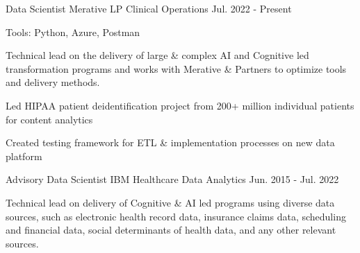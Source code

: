 

\begin{cventries}

  \cvexpentry
    {Data Scientist} %
    {Merative LP}
    {Clinical Operations} %
    {Jul. 2022 - Present}
    {
      \begin{cvheavyparagraph}
        Tools: Python, Azure, Postman
      \end{cvheavyparagraph}
    }
    {
      \begin{cvparagraph}
        Technical lead on the delivery of large \& complex AI and Cognitive led transformation programs and works with Merative \& Partners to optimize tools and delivery methods.
      \end{cvparagraph}
      \begin{cvitems}
        \item {Led HIPAA patient deidentification project from 200+ million individual patients for content analytics}
        \item {Created testing framework for ETL \& implementation processes on new data platform}
      \end{cvitems}
    }

  \cventry
    {Advisory Data Scientist} %
    {IBM} %
    {Healthcare Data Analytics} %
    {Jun. 2015 - Jul. 2022} %
    {
      \begin{cvcompactparagraph}
        Technical lead on delivery of Cognitive \& AI led programs using diverse data sources, such as electronic health record data, insurance claims data, scheduling and financial data, social determinants of health data, and any other relevant sources.
      \end{cvcompactparagraph}
    }


\end{cventries}

